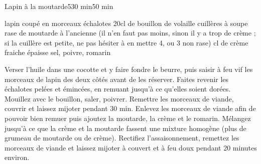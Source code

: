 \begin{recette}{Lapin à la moutarde}{5}{30 min}{50 min}
\begin{ingredients}[6 pers.]
 lapin coupé en morceaux
 échalotes
\ingredient 20cl de bouillon de volaille
 cuillères à soupe rase de moutarde à l'ancienne (il n'en faut pas moins, sinon il y a trop de crème ; si la cuillère est petite, ne pas hésiter à en mettre 4, ou 3 non rase)
 cl de crème fraiche épaisse
\ingredient sel, poivre, romarin
\end{ingredients}

\begin{preparation}
\etape Verser l'huile dans une cocotte et y faire fondre le beurre, puis saisir à feu vif les morceaux de lapin des deux côtés avant de les réserver.
\etape Faites revenir les échalotes pelées et émincées, en remuant jusqu'à ce qu'elles soient dorées.
\etape Mouillez avec le bouillon, saler, poivrer. Remettre les morceaux de viande, couvrir et laissez mijoter pendant 30 min.
\etape Enlevez les morceaux de viande afin de pouvoir bien remuer puis ajoutez la moutarde, la crème et le romarin. Mélangez jusqu'à ce que la crème et la moutarde fassent une mixture homogène (plus de grumeau de moutarde ou de crème). 
\etape Rectifiez l'assaisonnement, remettez les morceaux de viande et laissez mijoter à couvert et à feu doux pendant 20 minutes environ.
\end{preparation}
\end{recette}

